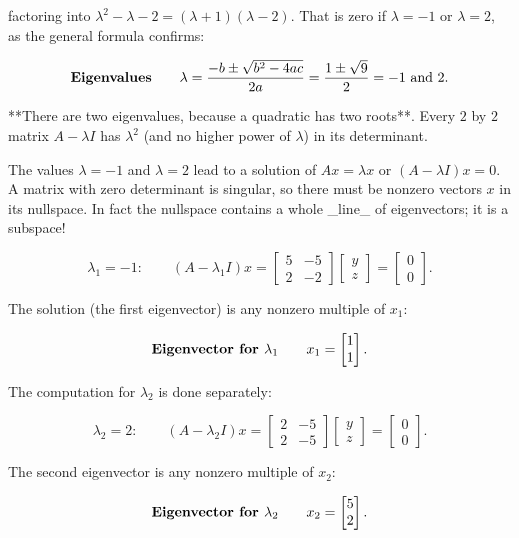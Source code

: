 factoring into \(\lambda^{2}-\lambda-2=(\lambda+1)(\lambda-2)\). That is zero if \(\lambda=-1\) or \(\lambda=2\), as the general formula confirms:

\[\text{\bf Eigenvalues}\qquad\lambda=\frac{-b\pm\sqrt{b^{2}-4ac}}{2a}=\frac{1\pm \sqrt{9}}{2}=-1\text{ and }2.\]

**There are two eigenvalues, because a quadratic has two roots**. Every \(2\) by \(2\) matrix \(A-\lambda I\) has \(\lambda^{2}\) (and no higher power of \(\lambda\)) in its determinant.

The values \(\lambda=-1\) and \(\lambda=2\) lead to a solution of \(Ax=\lambda x\) or \((A-\lambda I)x=0\). A matrix with zero determinant is singular, so there must be nonzero vectors \(x\) in its nullspace. In fact the nullspace contains a whole _line_ of eigenvectors; it is a subspace!

\[\lambda_{1}=-1:\qquad(A-\lambda_{1}I)x=\begin{bmatrix}5&-5\\ 2&-2\end{bmatrix}\begin{bmatrix}y\\ z\end{bmatrix}=\begin{bmatrix}0\\ 0\end{bmatrix}.\]

The solution (the first eigenvector) is any nonzero multiple of \(x_{1}\):

\[\text{\bf Eigenvector for }\lambda_{1}\qquad x_{1}=\begin{bmatrix}1\\ 1\end{bmatrix}.\]

The computation for \(\lambda_{2}\) is done separately:

\[\lambda_{2}=2:\qquad(A-\lambda_{2}I)x=\begin{bmatrix}2&-5\\ 2&-5\end{bmatrix}\begin{bmatrix}y\\ z\end{bmatrix}=\begin{bmatrix}0\\ 0\end{bmatrix}.\]

The second eigenvector is any nonzero multiple of \(x_{2}\):

\[\text{\bf Eigenvector for }\lambda_{2}\qquad x_{2}=\begin{bmatrix}5\\ 2\end{bmatrix}.\]

